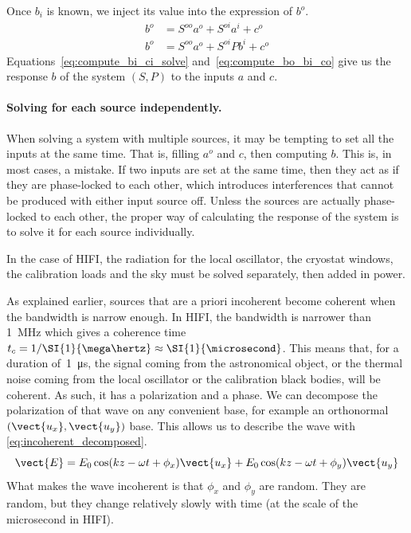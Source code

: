 Once $b_i$ is known, we inject its value into the expression of $b^o$.
\begin{subequations}
    \begin{align}
        b^o &= S^{oo} a^o + S^{oi} a^i + c^o \label{eq:compute_bo_ai_co}\\
        b^o &= S^{oo} a^o + S^{oi} Pb^i + c^o \label{eq:compute_bo_bi_co}
    \end{align}
    \label{eq:compute_bo_co}
\end{subequations}
Equations~\eqref{eq:compute_bi_ci_solve} and~\eqref{eq:compute_bo_bi_co} give us the response $b$ of the system $(S, P)$ to the inputs $a$ and $c$.


\paragraph{Solving for each source independently.}
\label{solving_for_each_source_independently}
When solving a system with multiple sources, it may be tempting to set all the inputs at the same time.
That is, filling $a^o$ and $c$, then computing $b$.
This is, in most cases, a mistake.
If two inputs are set at the same time, then they act as if they are phase-locked to each other, which introduces interferences that cannot be produced with either input source off.
Unless the sources are actually phase-locked to each other, the proper way of calculating the response of the system is to solve it for each source individually.

In the case of HIFI, the radiation for the local oscillator, the cryostat windows, the calibration loads and the sky must be solved separately, then added in power.

As explained earlier, sources that are a priori incoherent become coherent when the bandwidth is narrow enough.
In HIFI, the bandwidth is narrower than \SI{1}{\mega\hertz}
which gives a coherence time $t_c = 1/\SI{1}{\mega\hertz} \approx \SI{1}{\microsecond}$.
This means that, for a duration of~\SI{1}{\micro\second}, the signal coming from the astronomical object, or the thermal noise coming from the local oscillator or the calibration black bodies, will be coherent.
As such, it has a polarization and a phase.
We can decompose the polarization of that wave on any convenient base, for example an orthonormal $(\vect{u_x}, \vect{u_y})$ base.
This allows us to describe the wave with \cref{eq:incoherent_decomposed}.
\begin{equation}
    \vect{E} = E_0 \cos(kz - \omega t + \phi_x) \vect{u_x}
             + E_0 \cos(kz - \omega t + \phi_y) \vect{u_y}
    \label{eq:incoherent_decomposed}
\end{equation}
What makes the wave incoherent is that $\phi_x$ and $\phi_y$ are random.
They are random, but they change relatively slowly with time (at the scale of the microsecond in HIFI).

